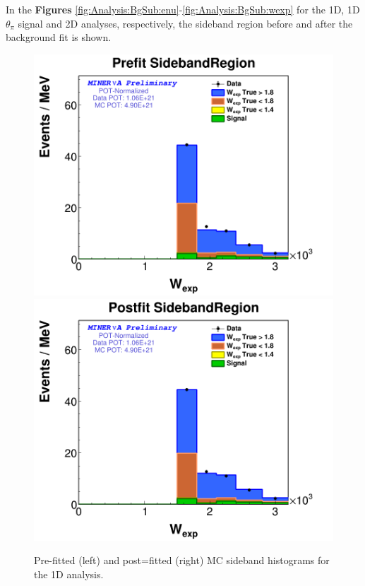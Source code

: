 In the \textbf{Figures} \ref{fig:Analysis:BgSub:enu}-\ref{fig:Analysis:BgSub:wexp} for the 1D, 1D $\theta_\pi$ signal and 2D analyses, respectively, the sideband region before and after the background fit is shown. 

\begin{figure}
    \centering
    \includegraphics[scale=0.2]{Figures/Chapter4/BGStudies/PreWFit_wexp_fit_1Pi_PN_SidebandRegion_1DAnalysis.png}
    \includegraphics[scale=0.2]{Figures/Chapter4/BGStudies/PostWFit_wexp_fit_1Pi_PN_SidebandRegion_1DAnalysis.png}
    \caption{Pre-fitted (left) and post=fitted (right) MC sideband histograms for the 1D analysis.}
    \label{fig:BgStudies:SidebandTunning:PrePosFit1DAnalysis}
\end{figure}



